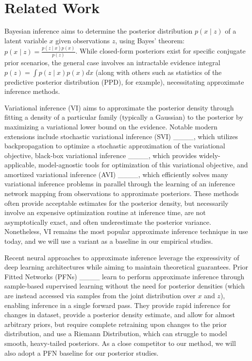 \section{Related Work}
Bayesian inference aims to determine the posterior distribution $p(x \mathop{|} z)$ of a latent variable $x$ given observations $z$, using Bayes' theorem: $p(x \mathop{|} z)=\frac{p(z \mathop{|} x)p(x)}{p(z)}$. While closed-form posteriors exist for specific conjugate prior scenarios, the general case involves an intractable evidence integral $p(z) = \int p(z \mathop{|} x)p(x)dx$ (along with others such as statistics of the predictive posterior distribution (PPD), for example), necessitating approximate inference methods.

Variational inference (VI) aims to approximate the posterior density through fitting a density of a particular family (typically a Gaussian) to the posterior by maximizing a variational lower bound on the evidence. Notable modern extensions include stochastic variational inference (SVI) ____, which utilizes backpropagation to optimize a stochastic approximation of the variational objective, black-box variational inference ____, which provides widely-applicable, model-agnostic tools for optimization of this variational objective, and amortized variational inference (AVI) ____, which efficiently solves many variational inference problems in parallel through the learning of an inference network mapping from observations to approximate posteriors.  These methods often provide acceptable estimates for the posterior density, but necessarily involve an expensive optimization routine at inference time, are not asymptotically exact, and often underestimate the posterior variance. Nonetheless, VI remains the most popular approximate inference technique in use today, and we will use a variant as a baseline in our empirical studies.

Recent neural approaches to approximate inference leverage the expressivity of deep learning architectures while aiming to maintain theoretical guarantees. Prior Fitted Networks (PFNs) ____ learn to perform approximate inference through sample-based supervised learning without the need for posterior densities (which are instead accessed via samples from the joint distribution over $x$ and $z$), enabling inference in a single forward pass. They provide rapid inference for changes in dataset, provide a posterior density estimate, and allow for almost arbitrary priors, but require complete retraining upon changes to the prior distribution, and use a Riemann Distribution, which can struggle to model smooth, heavy-tailed posteriors. As a close competitor to our method, we will also adopt a PFN baseline for our posterior studies. 

